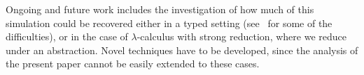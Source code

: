 \documentclass{LMCS}
\begin{document}
Ongoing and future work includes the investigation of how much of this simulation could be
recovered either in a typed setting (see~\cite{SplawskiU99} for some of the difficulties),
or in the case of $\lambda$-calculus with strong reduction, where we reduce under an abstraction. 
Novel techniques have to be developed, since the analysis of the present 
paper cannot be easily extended to these cases.



\end{document}
